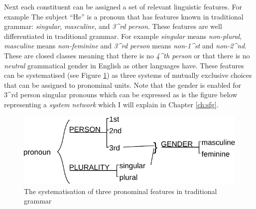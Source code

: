 
Next each constituent can be assigned a set of relevant linguistic features. For example The subject ``He'' is a pronoun that has features known in traditional grammar: \textit{singular}, \textit{masculine}, and \textit{3^{rd} person}. These features are well differentiated in traditional grammar. For example \textit{singular} means \textit{non-plural}, \textit{masculine} means \textit{non-feminine} and \textit{3^{rd} person} means \textit{non-1^{st}} and \textit{non-2^{nd}}. These are closed classes meaning that there is no \textit{4^{th} person} or that there is no \textit{neutral} grammatical gender in English as other languages have. These features can be systematised (see Figure \ref{fig:traditional-pronoun}) as three systems of mutually exclusive choices that can be assigned to pronominal units. Note that the gender is enabled for 3^{rd} person singular pronouns which can be expressed as is the figure below representing a \textit{system network} which I will explain in Chapter \ref{ch:sfg}.

\begin{figure}[!ht]
    \centering      
    \includegraphics[width=.56\textwidth]{Figures/Example/traditional-pronoun.pdf}      
    \caption{The systematisation of three pronominal features in traditional grammar}
    \label{fig:traditional-pronoun}
\end{figure}

